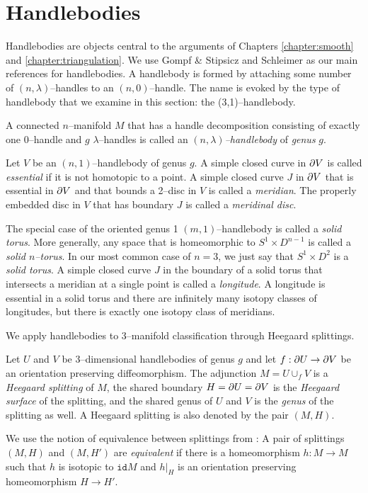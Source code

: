 \section{Handlebodies}
\label{section:problem-handlebodies}

Handlebodies are objects central to the arguments of Chapters \ref{chapter:smooth} and \ref{chapter:triangulation}.
We use Gompf \& Stipsicz \cite{GompStip} and Schleimer \cite{SchlWald} as our main references for handlebodies.
A handlebody is formed by attaching some number of $(n,\lambda)$--handles to an $(n,0)$--handle.
The name is evoked by the type of handlebody that we examine in this section: the (3,1)--handlebody.

\begin{defn}
	A connected $n$--manifold $M$ that has a handle decomposition consisting of exactly one 0--handle and $g$ $\lambda$--handles is called an \emph{$(n,\lambda)$--handlebody} of \emph{genus} $g$.
	
	Let $V$ be an $(n,1)$--handlebody of genus $g$.
	A simple closed curve in $\partial V$ is called \emph{essential} if it is not homotopic to a point.
	A simple closed curve $J$ in $\partial V$ that is essential in $\partial V$ and that bounds a 2--disc in $V$ is called a \emph{meridian}.
	The properly embedded disc in $V$ that has boundary $J$ is called a \emph{meridinal disc}.
	
	The special case of the oriented genus 1 $(m,1)$--handlebody is called a \emph{solid torus}.
	More generally, any space that is homeomorphic to $S^1\times D^{n-1}$ is called a \emph{solid $n$--torus}.
	In our most common case of $n=3$, we just say that $S^1\times D^2$ is a \emph{solid torus}.
	A simple closed curve $J$ in the boundary of a solid torus that intersects a meridian at a single point is called a \emph{longitude}.
	A longitude is essential in a solid torus and there are infinitely many isotopy classes of longitudes, but there is exactly one isotopy class of meridians.
\end{defn}

We apply handlebodies to 3--manifold classification through Heegaard splittings.

\begin{defn}	
	Let $U$ and $V$ be 3--dimensional handlebodies of genus $g$ and let $f:\partial U\to \partial V$ be an orientation preserving diffeomorphism.
	The adjunction $M=U\cup_f V$ is a \emph{Heegaard splitting} of $M$, the shared boundary $H = \partial U = \partial V$ is the \emph{Heegaard surface} of the splitting, and the shared genus of $U$ and $V$ is the \emph{genus} of the splitting as well.
	A Heegaard splitting is also denoted by the pair $(M,H)$.
	
	We use the notion of equivalence between splittings from \cite{SchlWald}:
	A pair of splittings $(M,H)$ and $(M,H')$ are \emph{equivalent} if there is a homeomorphism $h:M\to M$ such that $h$ is isotopic to $\texttt{id}M$ and $h|_H$ is an orientation preserving homeomorphism $H\to H'$.
\end{defn}

